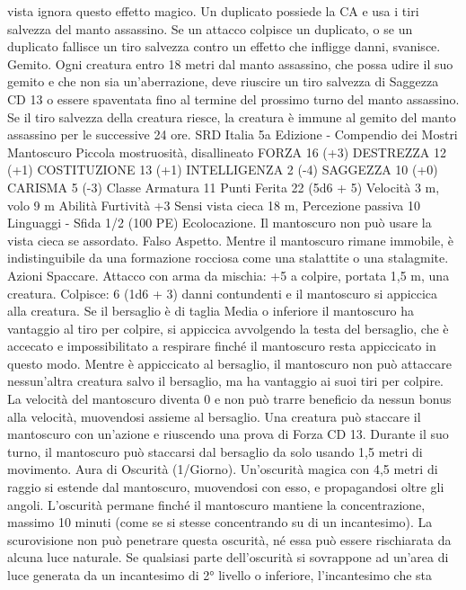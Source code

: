 \begin{multicols}{2}
vista ignora questo effetto magico.
Un duplicato possiede la CA e usa i tiri salvezza del manto assassino.
Se un attacco colpisce un duplicato, o se un duplicato fallisce un tiro
salvezza contro un effetto che infligge danni, svanisce.
Gemito. Ogni creatura entro 18 metri dal manto assassino, che possa
udire il suo gemito e che non sia un’aberrazione, deve riuscire un tiro
salvezza di Saggezza CD 13 o essere spaventata fino al termine del
prossimo turno del manto assassino. Se il tiro salvezza della creatura
riesce, la creatura è immune al gemito del manto assassino per le
successive 24 ore.
SRD Italia 5a Edizione - Compendio dei Mostri
Mantoscuro
Piccola mostruosità, disallineato
FORZA 16 (+3)
DESTREZZA 12 (+1)
COSTITUZIONE 13 (+1)
INTELLIGENZA 2 (-4)
SAGGEZZA 10 (+0)
CARISMA 5 (-3)
Classe Armatura 11
Punti Ferita 22 (5d6 + 5)
Velocità 3 m, volo 9 m
Abilità Furtività +3
Sensi vista cieca 18 m, Percezione passiva 10
Linguaggi -
Sfida 1/2 (100 PE)
Ecolocazione. Il mantoscuro non può usare la vista cieca se
assordato.
Falso Aspetto. Mentre il mantoscuro rimane immobile, è
indistinguibile da una formazione rocciosa come una stalattite o
una stalagmite.
Azioni
Spaccare. Attacco con arma da mischia: +5 a colpire, portata 1,5
m, una creatura.
Colpisce: 6 (1d6 + 3) danni contundenti e il mantoscuro si appiccica
alla creatura. Se il bersaglio è di taglia Media o inferiore il
mantoscuro ha vantaggio al tiro per colpire, si appiccica avvolgendo
la testa del bersaglio, che è accecato e impossibilitato a respirare
finché il mantoscuro resta appiccicato in questo modo.
Mentre è appiccicato al bersaglio, il mantoscuro non può attaccare
nessun’altra creatura salvo il bersaglio, ma ha vantaggio ai suoi tiri
per colpire. La velocità del mantoscuro diventa 0 e non può trarre
beneficio da nessun bonus alla velocità, muovendosi assieme al
bersaglio.
Una creatura può staccare il mantoscuro con un’azione e riuscendo
una prova di Forza CD 13. Durante il suo turno, il mantoscuro può
staccarsi dal bersaglio da solo usando 1,5 metri di movimento.
Aura di Oscurità (1/Giorno). Un’oscurità magica con 4,5 metri
di raggio si estende dal mantoscuro, muovendosi con esso, e
propagandosi oltre gli angoli. L’oscurità permane finché il
mantoscuro mantiene la concentrazione, massimo 10 minuti
(come se si stesse concentrando su di un incantesimo). La
scurovisione non può penetrare questa oscurità, né essa può
essere rischiarata da alcuna luce naturale. Se qualsiasi parte
dell’oscurità si sovrappone ad un’area di luce generata da un
incantesimo di 2° livello o inferiore, l’incantesimo che sta

\end{multicols}
